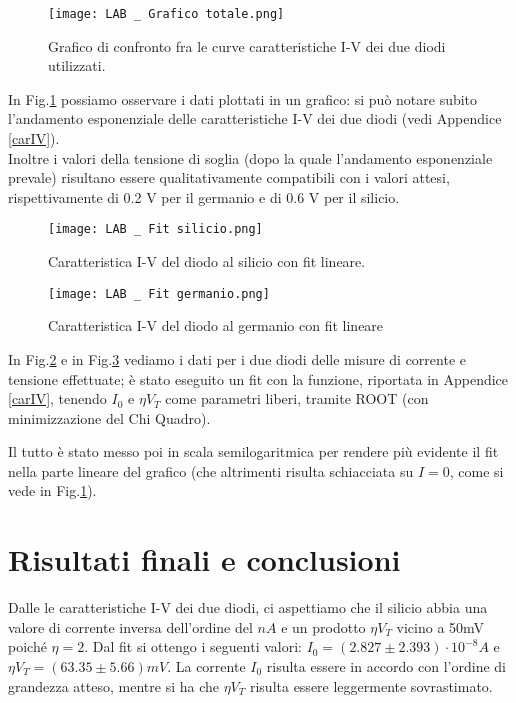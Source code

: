 \documentclass[a4paper, 11pt]{article}
\begin{document}
\begin{figure}[!htb]
    \centering
    \texttt{[image: LAB \_ Grafico totale.png]}
    \caption{Grafico di confronto fra le curve caratteristiche I-V dei due diodi utilizzati.}
    \label{fig:graficototale}
\end{figure}

In Fig.\ref{fig:graficototale} possiamo osservare i dati plottati in un grafico: si può notare subito l'andamento esponenziale delle caratteristiche I-V dei due diodi (vedi Appendice \ref{carIV}). \\
Inoltre i valori della tensione di soglia (dopo la quale l'andamento esponenziale prevale) risultano essere qualitativamente compatibili con i valori attesi, rispettivamente di 0.2 V per il germanio e di 0.6 V per il silicio.
\\

\begin{figure}[!htb]
    \centering
    \texttt{[image: LAB \_ Fit silicio.png]}
    \caption{Caratteristica I-V del diodo al silicio con fit lineare.}
    \label{fig:siliciofit}
\end{figure}

\newpage

\begin{figure}[!htb]
    \centering
    \texttt{[image: LAB \_ Fit germanio.png]}
    \caption{Caratteristica I-V del diodo al germanio con fit lineare}
    \label{fig:germaniofit}
\end{figure}

In Fig.\ref{fig:siliciofit} e in Fig.\ref{fig:germaniofit} vediamo i dati per i due diodi delle misure di corrente e tensione effettuate; è stato eseguito un fit con la funzione, riportata in Appendice \ref{carIV}, tenendo $I_0$ e $\eta V_T$ come parametri liberi, tramite ROOT (con minimizzazione del Chi Quadro).

Il tutto è stato messo poi in scala semilogaritmica per rendere più evidente il fit nella parte lineare del grafico (che altrimenti risulta schiacciata su $I = 0$, come si vede in Fig.\ref{fig:graficototale}).

\section{Risultati finali e conclusioni}
Dalle le caratteristiche I-V dei due diodi, ci aspettiamo che il silicio  abbia una valore di corrente inversa dell'ordine del $nA$ e un prodotto $\eta V_T$ vicino a 50mV poiché $\eta = 2 $.  Dal fit si ottengo i seguenti valori: $I_0 = ( 2.827 \pm 2.393) \cdot 10^{-8} A$ e $\eta V_T = (63.35 \pm 5.66) mV  $. La corrente $I_0$ risulta essere in accordo con l'ordine di grandezza atteso, mentre si ha che $\eta V_T$ risulta essere leggermente sovrastimato.
\end{document}
